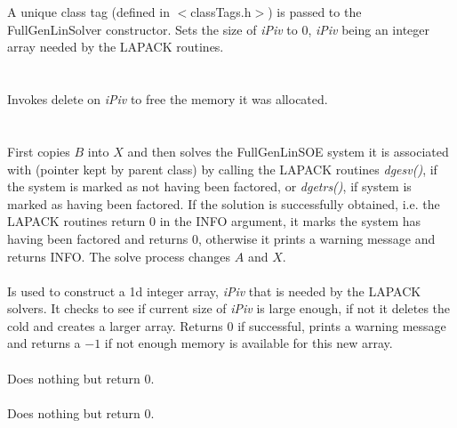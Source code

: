   \\
  \\
A unique class tag (defined in $<$classTags.h$>$) is passed to the
FullGenLinSolver constructor. Sets the size of {\em iPiv} to $0$, {\em
iPiv} being an integer array needed by the LAPACK routines. \\

 \\
\\ 
Invokes delete on {\em iPiv} to free the memory it was allocated. \\


  \\
 \\
First copies $B$ into $X$ and then solves the FullGenLinSOE system 
it is associated with (pointer kept by parent class) by calling the LAPACK 
routines {\em dgesv()}, if the system is marked as not having been factored,
or {\em dgetrs()}, if system is marked as having been factored. If the
solution is successfully obtained, i.e. the LAPACK routines return $0$
in the INFO argument, it marks the system has having been
factored and returns $0$, otherwise it prints a warning message and
returns INFO. The solve process changes $A$ and $X$. \\   

 \\
Is used to construct a 1d integer array, {\em iPiv} that is needed by
the LAPACK solvers. It checks to see if current size of {\em iPiv} is
large enough, if not it deletes the cold and creates a larger
array. Returns $0$ if successful, prints a warning message and returns
a $-1$ if not enough memory is available for this new array. \\


 \\ 
Does nothing but return $0$. \\

 \\ 
Does nothing but return $0$. \\




